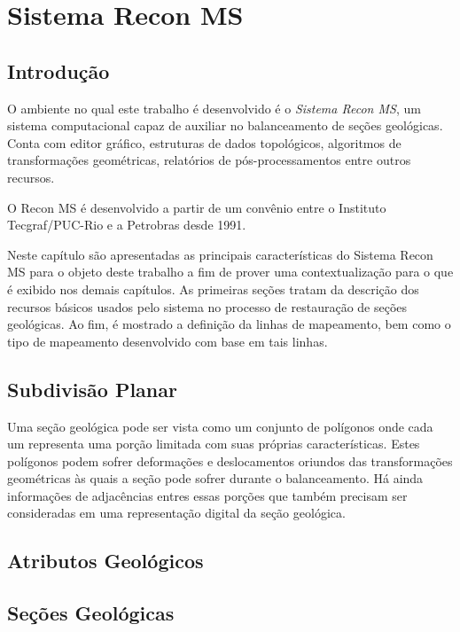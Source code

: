 
\chapter{Sistema Recon MS}

\section{Introdução}

O ambiente no qual este trabalho é desenvolvido é o \textit{Sistema Recon MS}, um sistema computacional capaz de auxiliar no balanceamento de seções geológicas. Conta com editor gráfico, estruturas de dados topológicos, algoritmos de transformações geométricas, relatórios de pós-processamentos entre outros recursos.

O Recon MS é desenvolvido a partir de um convênio entre o Instituto Tecgraf/PUC-Rio e a Petrobras desde 1991.

Neste capítulo são apresentadas as principais características do Sistema Recon MS para o objeto deste trabalho a fim de prover uma contextualização para o que é exibido nos demais capítulos. As primeiras seções tratam da descrição dos recursos básicos usados pelo sistema no processo de restauração de seções geológicas. Ao fim, é mostrado a definição da linhas de mapeamento, bem como o tipo de mapeamento desenvolvido com base em tais linhas.

\section{Subdivisão Planar} %

Uma seção geológica pode ser vista como um conjunto de polígonos onde cada um representa uma porção limitada com suas próprias características. Estes polígonos podem sofrer deformações e deslocamentos oriundos das transformações geométricas às quais a seção pode sofrer durante o balanceamento. Há ainda informações de adjacências entres essas porções que também precisam ser consideradas em uma representação digital da seção geológica.



\section{Atributos Geológicos}

\section{Seções Geológicas} %

